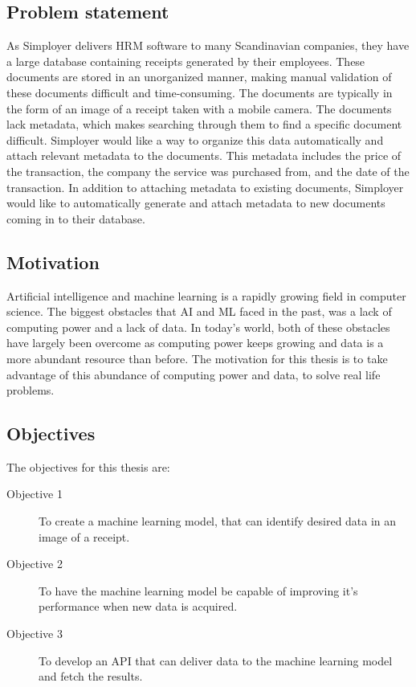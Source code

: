 \subsection{Problem statement}\label{subsec:problem-statement}
As Simployer delivers HRM software to many Scandinavian companies, they have a large database containing receipts
generated by their employees.
These documents are stored in an unorganized manner, making manual validation of these documents difficult and time-consuming.
The documents are typically in the form of an image of a receipt taken with a mobile camera.
The documents lack metadata, which makes searching through them to find a specific document difficult.
Simployer would like a way to organize this data automatically and attach relevant metadata to the documents.
This metadata includes the price of the transaction, the company the service was purchased from, and the date of the transaction.
In addition to attaching metadata to existing documents, Simployer would like to automatically generate and attach metadata to new documents coming in to their database.

\subsection{Motivation}\label{subsec:motivation}
Artificial intelligence and machine learning is a rapidly growing field in computer science.
The biggest obstacles that AI and ML faced in the past, was a lack of computing power and a lack of data.
In today's world, both of these obstacles have largely been overcome as computing power keeps growing and data is a
more abundant resource than before.
The motivation for this thesis is to take advantage of this abundance of computing power and data, to solve real life
problems.

\subsection{Objectives}\label{subsec:objectives}
The objectives for this thesis are:
\begin{description}
    \item[Objective 1] To create a machine learning model, that can identify desired data in an image of a receipt.
    \item[Objective 2] To have the machine learning model be capable of improving it's performance when new data is acquired.
    \item[Objective 3] To develop an API that can deliver data to the machine learning model and fetch the results.
\end{description}

